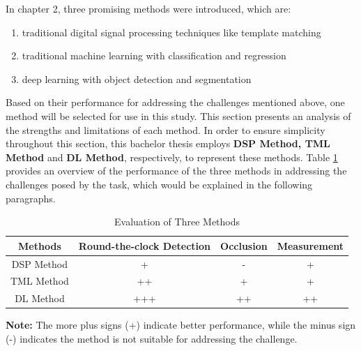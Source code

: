In chapter 2, three promising methods were introduced, which are:

\begin{enumerate}
  \item traditional digital signal processing techniques like template matching
  \item traditional machine learning with classification and regression
  \item deep learning with object detection and segmentation
\end{enumerate}

Based on their performance for addressing the challenges mentioned above, one method will be selected for use in this study. This section presents an analysis of the strengths and limitations of each method. In order to ensure simplicity throughout this section, this bachelor thesis employs \textbf{DSP Method, TML Method} and \textbf{DL Method}, respectively, to represent these methods. Table \ref{tab:1} provides an overview of the performance of the three methods in addressing the challenges posed by the task, which would be explained in the following paragraphs.

\begin{table}
  \centering
  \caption{Evaluation of Three Methods}
  \label{tab:1}
  \begin{tabular}{cccc}
    \toprule
    Methods & Round-the-clock Detection & Occlusion & Measurement \\
    \midrule
    DSP Method &  + & - & + \\
    TML Method & ++ & + & + \\
    DL Method & +++ & ++ & ++ \\
    \bottomrule
  \end{tabular}
  \vspace{0.8em}
  \begin{tablenotes}
    \item \textbf{Note:} The more plus signs (+) indicate better performance, while the minus sign (-) indicates the method is not suitable for addressing the challenge.
    
  \end{tablenotes}
\end{table}

